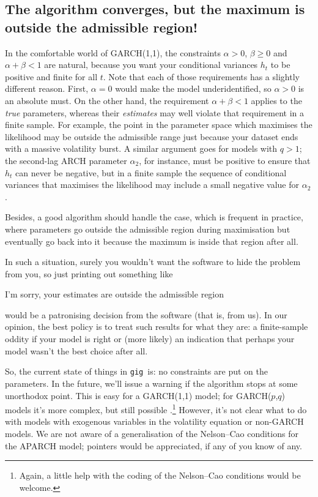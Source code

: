 \documentclass[a4paper,11pt]{article}
\newcommand{\gig}{\texttt{gig}}
\begin{document}
\subsection{The algorithm converges, but the maximum is outside the
  admissible region!}

In the comfortable world of GARCH(1,1), the constraints $\alpha > 0$,
$\beta \ge 0$ and $\alpha + \beta < 1$ are natural, because you want
your conditional variances $h_t$ to be positive and finite for all
$t$. Note that each of those requirements has a slightly different
reason. First, $\alpha = 0$ would make the model underidentified, so
$\alpha > 0$ is an absolute must. On the other hand, the requirement
$\alpha + \beta < 1$ applies to the \emph{true} parameters, whereas
their \emph{estimates} may well violate that requirement in a finite
sample. For example, the point in the parameter space which maximises
the likelihood may be outside the admissible range just because your
dataset ends with a massive volatility burst. A similar argument goes
for models with $q>1$; the second-lag ARCH parameter $\alpha_2$, for
instance, must be positive to ensure that $h_t$ can never be negative,
but in a finite sample the sequence of conditional variances that
maximises the likelihood may include a small negative value for
$\alpha_2$.

Besides, a good algorithm should handle the case, which is frequent in
practice, where parameters go outside the admissible region during
maximisation but eventually go back into it because the maximum is
inside that region after all.

In such a situation, surely you wouldn't want the software to hide the
problem from you, so just printing out something like
\begin{code}
  I'm sorry, your estimates are outside the admissible region
\end{code}
would be a patronising decision from the software (that is, from
us). In our opinion, the best policy is to treat such results for
what they are: a finite-sample oddity if your model is right or (more
likely) an indication that perhaps your model wasn't the best choice
after all.

So, the current state of things in \gig\ is: no constraints are put on
the parameters. In the future, we'll issue a warning if the algorithm
stops at some unorthodox point. This is easy for a GARCH(1,1) model;
for GARCH($p$,$q$) models it's more complex, but still possible
\citep{NelCao92}.\footnote{Again, a little help with the coding of the
  Nelson--Cao conditions would be welcome.}  However, it's not clear
what to do with models with exogenous variables in the volatility
equation or non-GARCH models. We are not aware of a generalisation of
the Nelson--Cao conditions for the APARCH model; pointers would be
appreciated, if any of you know of any.
\end{document}
